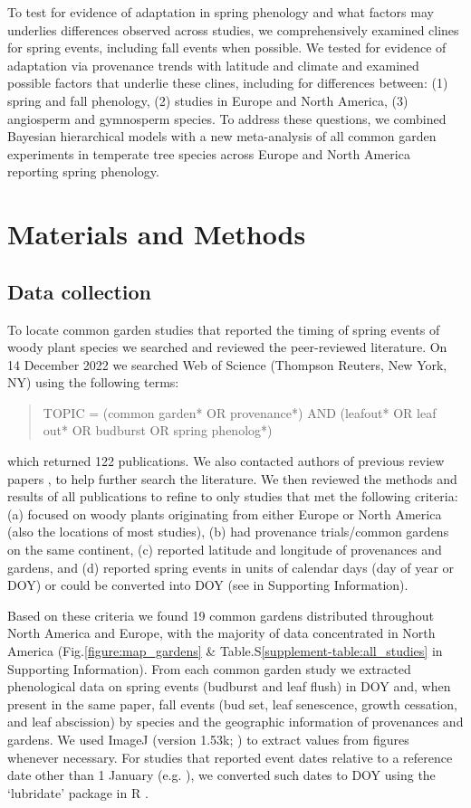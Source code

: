 \documentclass{article}
\begin{document}
To test for evidence of adaptation in spring phenology and what factors may underlies differences observed across studies, we comprehensively examined clines for spring events, including fall events when possible. We tested for evidence of adaptation via provenance trends with latitude and climate and examined possible factors that underlie these clines, including for differences between: (1) spring and fall phenology, (2) studies in Europe and North America, (3) angiosperm and gymnosperm species. To address these questions, we combined Bayesian hierarchical models with a new meta-analysis of all common garden experiments in temperate tree species across Europe and North America reporting spring phenology. 

\section{Materials and Methods}
\subsection{Data collection}
To locate common garden studies that reported the timing of spring events of woody plant species we searched and reviewed the peer-reviewed literature. On 14 December 2022 we searched Web of Science (Thompson Reuters, New York, NY) using the following terms:
\begin{quote}
TOPIC = (common garden* OR provenance*) AND (leafout* OR leaf out* OR budburst OR spring phenolog*)
\end{quote}
which returned 122 publications. We also contacted authors of previous review papers \citep{AitkenBemmels16, Alberto13}, to help further search the literature. We then reviewed the methods and results of all publications to refine to only studies that met the following criteria: (a) focused on woody plants originating from either Europe or North America (also the locations of most studies), (b) had provenance trials/common gardens on the same continent, (c) reported latitude and longitude of provenances and gardens, and (d) reported spring events in units of calendar days (day of year or DOY) or could be converted into DOY (see  in Supporting Information).

Based on these criteria we found 19 common gardens distributed throughout North America and Europe, with the majority of data concentrated in North America (Fig.\ref{figure:map_gardens} \& Table.S\ref{supplement-table:all_studies} in Supporting Information). From each common garden study we extracted phenological data on spring events (budburst and leaf flush) in DOY and, when present in the same paper, fall events (bud set, leaf senescence, growth cessation, and leaf abscission) by species and the geographic information of provenances and gardens. We used ImageJ (version 1.53k; \citealp{schneider_rasband_eliceiri_2012}) to extract values from figures whenever necessary. For studies that reported event dates relative to a reference date other than 1 January (e.g. \citealp{Rehfeldt1994}), we converted such dates to DOY using the `lubridate' package in R \citep{Grolemund11}. 
\end{document}
